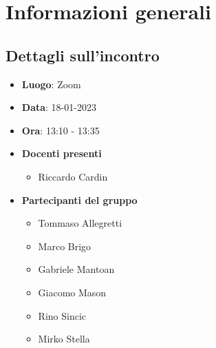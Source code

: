 \section{Informazioni generali}

\subsection{Dettagli sull'incontro}
\begin{itemize}
    \item \textbf{Luogo}: Zoom
    \item \textbf{Data}: 18-01-2023
    \item \textbf{Ora}: 13:10 - 13:35
    \item \textbf{Docenti presenti}
        \begin{itemize}
            \item Riccardo Cardin
        \end{itemize}
    \item \textbf{Partecipanti del gruppo}
        \begin{itemize}
            \item Tommaso Allegretti
            \item Marco Brigo
            \item Gabriele Mantoan
            \item Giacomo Mason
            \item Rino Sincic
            \item Mirko Stella
        \end{itemize}
\end{itemize}

